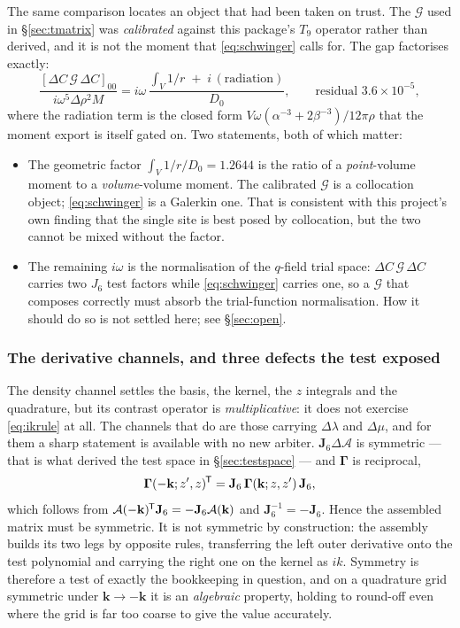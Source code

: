 \documentclass[11pt,a4paper]{article}
\newcommand{\Aop}{\mathcal{A}}
\newcommand{\dA}{\Delta\mathcal{A}}
\newcommand{\Jsix}{\mathbf{J}_{6}}
\newcommand{\tp}{^{\mkern-1.5mu\mathsf{T}}}
\begin{document}
The same comparison locates an object that had been taken on trust.  The
$\mathcal{G}$ used in \S\ref{sec:tmatrix} was \emph{calibrated} against this
package's $T_9$ operator rather than derived, and it is not the moment that
\eqref{eq:schwinger} calls for.  The gap factorises exactly:
\begin{equation}\label{eq:gapfactor}
  \frac{[\Delta C\,\mathcal{G}\,\Delta C]_{00}}{i\omega^5\Delta\rho^2 M}
  = i\omega\,\frac{\int_V 1/r \;+\; i\,(\text{radiation})}{D_0},
  \qquad \text{residual } 3.6\times10^{-5},
\end{equation}
where the radiation term is the closed form
$V\omega(\alpha^{-3}+2\beta^{-3})/12\pi\rho$ that the moment export is itself
gated on.  Two statements, both of which matter:
\begin{itemize}
\item The geometric factor $\int_V 1/r \big/ D_0 = 1.2644$ is the ratio of a
  \emph{point}-volume moment to a \emph{volume}-volume moment.  The calibrated
  $\mathcal{G}$ is a collocation object; \eqref{eq:schwinger} is a Galerkin one.
  That is consistent with this project's own finding that the single site is
  best posed by collocation, but the two cannot be mixed without the factor.
\item The remaining $i\omega$ is the normalisation of the $q$-field trial space:
  $\Delta C\,\mathcal{G}\,\Delta C$ carries two $J_6$ test factors while
  \eqref{eq:schwinger} carries one, so a $\mathcal{G}$ that composes correctly
  must absorb the trial-function normalisation.  How it should do so is not
  settled here; see \S\ref{sec:open}.
\end{itemize}

\subsubsection*{The derivative channels, and three defects the test exposed}

The density channel settles the basis, the kernel, the $z$ integrals and the
quadrature, but its contrast operator is \emph{multiplicative}: it does not
exercise \eqref{eq:ikrule} at all.  The channels that do are those carrying
$\Delta\lambda$ and $\Delta\mu$, and for them a sharp statement is available with
no new arbiter.  $\Jsix\dA$ is symmetric --- that is what derived the test space
in \S\ref{sec:testspace} --- and $\boldsymbol\Gamma$ is reciprocal,
\begin{equation}\label{eq:recip}
  \boldsymbol\Gamma(-\mathbf{k}; z', z)\tp =
  \Jsix\, \boldsymbol\Gamma(\mathbf{k}; z, z')\, \Jsix ,
\end{equation}
which follows from $\Aop(-\mathbf{k})\tp\Jsix = -\Jsix\Aop(\mathbf{k})$ and
$\Jsix^{-1} = -\Jsix$.  Hence the assembled matrix must be symmetric.  It is not
symmetric by construction: the assembly builds its two legs by opposite rules,
transferring the left outer derivative onto the test polynomial and carrying the
right one on the kernel as $ik$.  Symmetry is therefore a test of exactly the
bookkeeping in question, and on a quadrature grid symmetric under
$\mathbf{k}\to-\mathbf{k}$ it is an \emph{algebraic} property, holding to round-off
even where the grid is far too coarse to give the value accurately.
\end{document}
